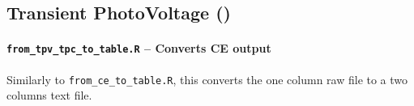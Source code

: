 	\subsection{Transient PhotoVoltage ()}\label{r_tpv}

		\paragraph{\texttt{from\_tpv\_tpc\_to\_table.R} -- Converts CE output}
		Similarly to \texttt{from\_ce\_to\_table.R}, this converts the one column raw file to a two columns text file.

%		
%				
%		
%		
%
%
%
